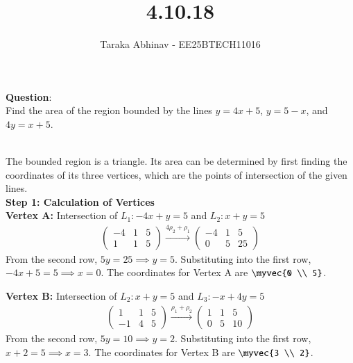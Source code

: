 \documentclass[journal]{IEEEtran}
\begin{document}


\title{4.10.18}
\author{Taraka Abhinav - EE25BTECH11016}
{\let\newpage\relax\maketitle}

\renewcommand{\thefigure}{\theenumi}
\renewcommand{\thetable}{\theenumi}
\setlength{\intextsep}{10pt}

\renewcommand{\thetable}{\theenumi}

\textbf{Question}:\\
Find the area of the region bounded by the lines $y=4x+5$, $y=5-x$, and $4y=x+5$.

\solution \\
The bounded region is a triangle. Its area can be determined by first finding the coordinates of its three vertices, which are the points of intersection of the given lines.\\

\textbf{Step 1: Calculation of Vertices}\\

\textbf{Vertex A:} Intersection of $L_1: -4x+y=5$ and $L_2: x+y=5$
\begin{align}
\left( \begin{array}{cc|c} -4 & 1 & 5 \\ 1 & 1 & 5 \end{array} \right) \xrightarrow{4\rho_2+\rho_1} \left( \begin{array}{cc|c} -4 & 1 & 5 \\ 0 & 5 & 25 \end{array} \right)
\end{align}
From the second row, $5y=25 \implies y=5$. Substituting into the first row, $-4x+5=5 \implies x=0$.
The coordinates for Vertex A are $\myvec{0 \\ 5}$.

\textbf{Vertex B:} Intersection of $L_2: x+y=5$ and $L_3: -x+4y=5$
\begin{align}
\left( \begin{array}{cc|c} 1 & 1 & 5 \\ -1 & 4 & 5 \end{array} \right) \xrightarrow{\rho_1+\rho_2} \left( \begin{array}{cc|c} 1 & 1 & 5 \\ 0 & 5 & 10 \end{array} \right)
\end{align}
From the second row, $5y=10 \implies y=2$. Substituting into the first row, $x+2=5 \implies x=3$.
The coordinates for Vertex B are $\myvec{3 \\ 2}$.
\end{document}
